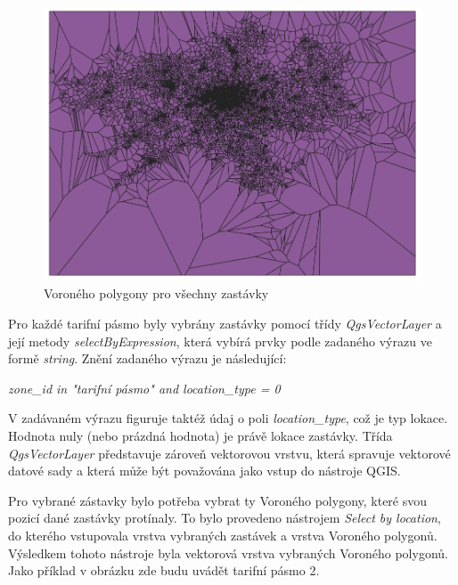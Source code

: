 \begin{figure}[H] \centering
    \includegraphics[width=400pt]{./pictures/voronoi-stops.png}
    \caption[Voroného polygony pro všechny zastávky]{Voroného polygony pro všechny zastávky}
	\label{fig:voronoi-stops}              
\end{figure}
  
Pro každé tarifní pásmo byly vybrány zastávky pomocí třídy \textit{QgsVectorLayer}
a její metody \textit{selectByExpression}, která vybírá prvky podle zadaného výrazu ve formě \textit{string}.
Znění zadaného výrazu je následující:

\textit{zone\_id in "tarifní pásmo" and location\_type = 0}

V zadávaném výrazu figuruje taktéž údaj o poli \textit{location\_type}, což je typ lokace. 
Hodnota nuly (nebo prázdná hodnota) je právě lokace zastávky. 
Třída \textit{QgsVectorLayer} představuje zároveň vektorovou vrstvu, která spravuje
vektorové datové sady a která může být považována jako vstup do nástroje QGIS. %

Pro vybrané zástavky bylo potřeba vybrat ty Voroného polygony, které svou
pozicí dané zastávky protínaly. To bylo provedeno nástrojem \textit{Select by location},
do kterého vstupovala vrstva vybraných zastávek a vrstva Voroného polygonů. Výsledkem tohoto nástroje byla
vektorová vrstva vybraných Voroného polygonů. Jako příklad v obrázku zde budu uvádět tarifní pásmo 2.


